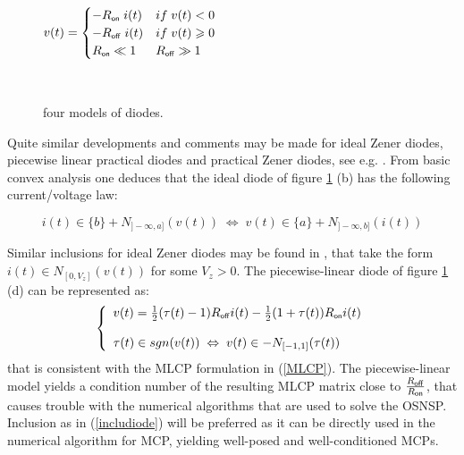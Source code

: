 \begin{figure}
{\begin{minipage}{0.22\linewidth}
          \begin{center}
            \resizebox{\linewidth}{!}{} \\
            { \footnotesize $v(t)=\begin{cases}-R_\on\; i(t) & \mbox{if}\;v(t) < 0 \\   -R_\off\; i(t) & \mbox{if}\;v(t) \geq  0 \\ R_\on \ll 1 & R_\off \gg 1 \end{cases}$ }\\
          \end{center}
          $ $ \\
        \end{minipage} }
      \caption{four models of diodes.}
\label{figdiodes}
\end{figure}



Quite similar developments and comments may be made for ideal Zener diodes, piecewise linear practical diodes and practical Zener diodes, see e.g. \cite{acary-brogliato2008,addi2009}. From basic convex analysis one deduces that the ideal diode of figure \ref{figdiodes} (b) has the following current/voltage law: 

\begin{equation}\label{includiode}
i(t) \in \{b\}+N_{]-\infty,a]}(v(t))\;\Leftrightarrow \; v(t) \in \{a\}+N_{]-\infty,b]}(i(t))
\end{equation} 

Similar inclusions for ideal Zener diodes may be found in \cite{acary-brogliato2008,addi2009}, that take the form $i(t) \in N_{[0,V_{z}]}(v(t))$ for some $V_{z} >0$. The piecewise-linear  diode of figure \ref{figdiodes} (d) can be represented as:
\begin{equation}\label{includiode2}
\left\{\begin{array}{l}
v(t)=\frac{1}{2}(\tau(t)-1) R_\off i(t) -\frac{1}{2}(1+\tau(t)) R_\on i(t) \\ \\ \tau(t) \in \mbox{sgn}(v(t))\; \Leftrightarrow \; v(t) \in - N_{[-1,1]}(\tau(t))
\end{array}\right.
\end{equation}
that is consistent with the MLCP formulation in (\ref{MLCP}). The piecewise-linear model yields a condition number of the resulting MLCP matrix close to $\frac{R_\off}{R_\on}$, that causes trouble with the numerical algorithms that are used to solve the OSNSP. Inclusion as in (\ref{includiode}) will be preferred as it can be directly used in the numerical algorithm for MCP, yielding well-posed and well-conditioned MCPs. 



